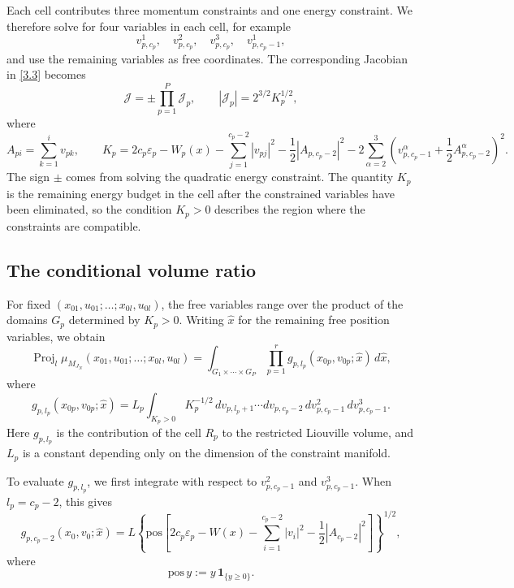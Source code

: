 \documentclass[11pt]{article}
\begin{document}
Each cell contributes three momentum constraints and one energy constraint. We therefore solve for four variables in each cell, for example
\[
v_{p,c_p}^1,\quad v_{p,c_p}^2,\quad v_{p,c_p}^3,\quad v_{p,c_p-1}^1,
\]
and use the remaining variables as free coordinates. The corresponding Jacobian in \eqref{3.3} becomes
\begin{equation}
\mathcal J=\pm\prod_{p=1}^P\mathcal J_p,
\qquad
|\mathcal J_p|=2^{3/2}K_p^{1/2},
\tag{5.11}\label{5.11}
\end{equation}
where
\begin{equation}
A_{pi}=\sum_{k=1}^i v_{pk},
\qquad
K_p
=
2c_p\varepsilon_p
-
W_p(x)
-
\sum_{j=1}^{c_p-2}|v_{pj}|^2
-\frac12|A_{p,c_p-2}|^2
-
2\sum_{\alpha=2}^3
\left(v^\alpha_{p,c_p-1}+\frac12A^\alpha_{p,c_p-2}\right)^2.
\tag{5.12}\label{5.12}
\end{equation}
The sign $\pm$ comes from solving the quadratic energy constraint. The quantity $K_p$ is the remaining energy budget in the cell after the constrained variables have been eliminated, so the condition $K_p>0$ describes the region where the constraints are compatible.

\subsection{The conditional volume ratio}

For fixed $(x_{01},u_{01};\dots;x_{0l},u_{0l})$, the free variables range over the product of the domains $G_p$ determined by $K_p>0$. Writing $\hat x$ for the remaining free position variables, we obtain
\begin{equation}
\operatorname{Proj}_l\mu_{M_{J_N}}(x_{01},u_{01};\dots;x_{0l},u_{0l})
=
\int_{G_1\times\cdots\times G_P}
\prod_{p=1}^r g_{p,l_p}(x_{0p},v_{0p};\hat x)\,d\hat x,
\tag{5.13}\label{5.13}
\end{equation}
where
\[
g_{p,l_p}(x_{0p},v_{0p};\hat x)
=
L_p
\int_{K_p>0}
K_p^{-1/2}\,
dv_{p,l_p+1}\cdots dv_{p,c_p-2}\,dv_{p,c_p-1}^2\,dv_{p,c_p-1}^3.
\]
Here $g_{p,l_p}$ is the contribution of the cell $R_p$ to the restricted Liouville volume, and $L_p$ is a constant depending only on the dimension of the constraint manifold.

To evaluate $g_{p,l_p}$, we first integrate with respect to $v_{p,c_p-1}^2$ and $v_{p,c_p-1}^3$. When $l_p=c_p-2$, this gives
\begin{equation}
g_{p,c_p-2}(x_0,v_0;\hat x)
=
L
\left\{
\mathrm{pos}
\left[
2c_p\varepsilon_p
-
W(x)
-
\sum_{i=1}^{c_p-2}|v_i|^2
-
\frac12|A_{c_p-2}|^2
\right]
\right\}^{1/2},
\tag{5.14}\label{5.14}
\end{equation}
where
\[
\mathrm{pos}\,y := y\,\mathbf 1_{\{y\ge 0\}}.
\]
\end{document}
